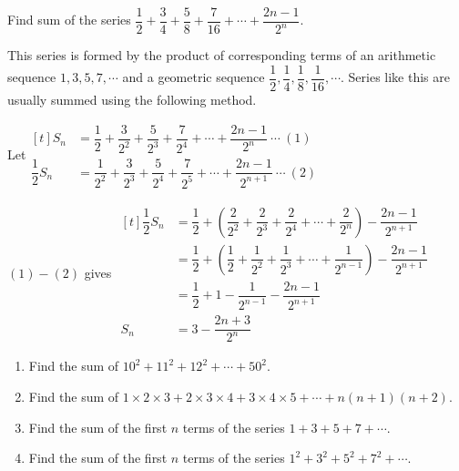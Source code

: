 \documentclass{report}
\begin{document}
        \begin{question}
            Find sum of the series $\dfrac{1}{2}+\dfrac{3}{4}+\dfrac{5}{8}+\dfrac{7}{16}+\cdots+\dfrac{2 n-1}{2^{n}}$.

            \sol{}

            \noindent This series is formed by the product of corresponding terms of an arithmetic sequence $1, 3, 5, 7, \cdots$ and a geometric sequence $\dfrac{1}{2}, \dfrac{1}{4}, \dfrac{1}{8}, \dfrac{1}{16}, \cdots$. Series like this are usually summed using the following method.

            \noindent Let$\begin{aligned}[t] S_n & =\dfrac{1}{2}+\dfrac{3}{2^2}+\dfrac{5}{2^3}+\dfrac{7}{2^4}+\cdots+\dfrac{2 n-1}{2^n}\ \cdots\ (1) \\ \dfrac{1}{2} S_n & =\dfrac{1}{2^2}+\dfrac{3}{2^3}+\dfrac{5}{2^4}+\dfrac{7}{2^5}+\cdots+\dfrac{2 n-1}{2^{n+1}}\ \cdots\ (2)\end{aligned}$
        \end{question}

        \setcounter{Question}{40}
        \begin{question}
            $(1) - (2)$ gives $\begin{aligned}[t] \dfrac{1}{2} S_n & =\dfrac{1}{2}+\left(\dfrac{2}{2^2}+\dfrac{2}{2^3}+\dfrac{2}{2^4}+\cdots+\dfrac{2}{2^n}\right)-\dfrac{2 n-1}{2^{n+1}} \\ & =\dfrac{1}{2}+\left(\dfrac{1}{2}+\dfrac{1}{2^2}+\dfrac{1}{2^3}+\cdots+\dfrac{1}{2^{n-1}}\right)-\dfrac{2 n-1}{2^{n+1}} \\ & =\dfrac{1}{2}+1-\dfrac{1}{2^{n-1}}-\dfrac{2 n-1}{2^{n+1}} \\ S_n & =3-\dfrac{2 n+3}{2^n}\end{aligned}$
        \end{question}

        \begin{enumerate}
            \item Find the sum of $10^{2}+11^{2}+12^{2}+\cdots+50^{2}$.

            \item Find the sum of $1 \times 2 \times 3+2 \times 3 \times 4+3 \times 4 \times 5+\cdots+n(n+1)(n+2)$.
            \item Find the sum of the first $n$ terms of the series $1+3+5+7+\cdots$.
            \item Find the sum of the first $n$ terms of the series $1^{2}+3^{2}+5^{2}+7^{2}+\cdots$.
        \end{enumerate}
\end{document}
